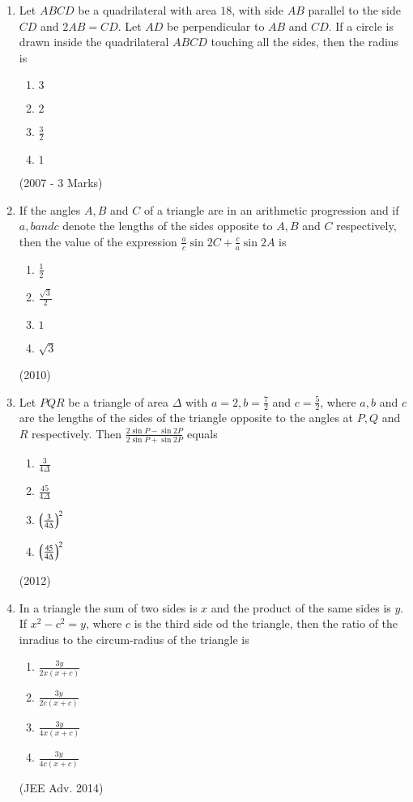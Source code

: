 \documentclass[journal,12pt,twocolumn]{IEEEtran}
\theoremstyle{remark}
\begin{document}
\begin{enumerate}
\item Let $ABCD$ be a quadrilateral with area $18$, with side $AB$ parallel to the side $CD$ and $2AB = CD$. Let $AD$ be perpendicular to $AB$ and $CD$. If a circle is drawn inside the quadrilateral $ABCD$ touching all the sides, then the radius is
\begin{enumerate}[label = (\alph*)]
\item $3$
\item $2$
\item $\frac{3}{2}$
\item $1$
\end{enumerate}
\hfill (2007 - 3 Marks)\\

\item If the angles $A, B$ and $C$ of a triangle are in an arithmetic progression and if $a, b and c$ denote the lengths of the sides opposite to $A, B$ and $C$ respectively, then the value of the expression $\frac{a}{c}\sin 2C + \frac{c}{a} \sin 2A$ is
\begin{enumerate}[label = (\alph*)]
\item $\frac{1}{2}$
\item $\frac{\sqrt{3}}{2}$
\item $1$
\item $\sqrt{3}$
\end{enumerate}
\hfill (2010)\\

\item Let $PQR$ be a triangle of area $\Delta$ with $a=2, b= \frac{7}{2}$ and $c=\frac{5}{2}$, where $a, b$ and $c$ are the lengths of the sides of the triangle opposite to the angles at $P, Q$ and $R$ respectively. Then $\frac{2\sin P - \sin 2P}{2\sin P + \sin 2P}$ equals
\begin{enumerate}[label = (\alph*)]
\item $\frac{3}{4\Delta}$
\item $\frac{45}{4\Delta}$
\item $\left(\frac{3}{4\Delta}\right)^2$
\item $\left(\frac{45}{4\Delta}\right)^2$
\end{enumerate}
\hfill (2012)\\

\item In a triangle the sum of two sides is $x$ and the product of the same sides is $y$. If $x^2-c^2=y$, where $c$ is the third side od the triangle, then the ratio of the inradius to the circum-radius of the triangle is
\begin{enumerate}[label = (\alph*)]
\item $\frac{3y}{2x(x+c)}$
\item $\frac{3y}{2c(x+c)}$
\item $\frac{3y}{4x(x+c)}$
\item $\frac{3y}{4c(x+c)}$
\end{enumerate}
\hfill (JEE Adv. 2014)

\end{enumerate}
\end{document}
